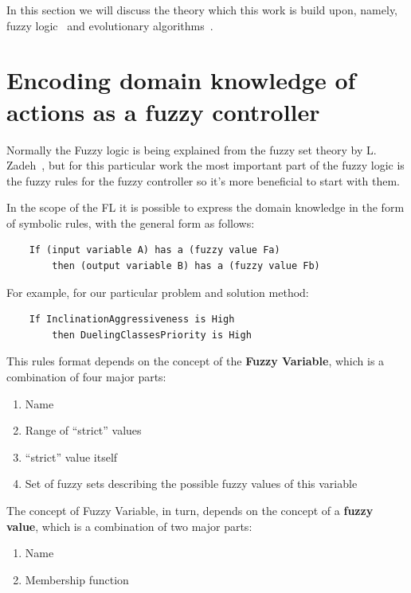 \documentclass[12pt, a4paper]{report}
\begin{document}
  In this section we will discuss the theory which this work is build upon, namely, fuzzy logic~\cite{ray2014softcomputing} and evolutionary algorithms~\cite{mitchell1999geneticalgorithms}.

	\section{Encoding domain knowledge of actions as a fuzzy controller}

  Normally the Fuzzy logic is being explained from the fuzzy set theory by L. Zadeh~\cite{zadeh1965fuzzy}, but for this particular work the most important part of the fuzzy logic is the fuzzy rules for the fuzzy controller so it's more beneficial to start with them.

  In the scope of the FL it is possible to express the domain knowledge in the form of symbolic rules, with the general form as follows:

  \begin{verbatim}
    If (input variable A) has a (fuzzy value Fa) 
    	then (output variable B) has a (fuzzy value Fb)
  \end{verbatim}

  For example, for our particular problem and solution method:

  \begin{verbatim}
    If InclinationAggressiveness is High 
    	then DuelingClassesPriority is High
  \end{verbatim}

  This rules format depends on the concept of the \textbf{Fuzzy Variable}, which is a combination of four major parts:

  \begin{enumerate}
    \item Name
    \item Range of ``strict'' values
    \item ``strict'' value itself
    \item Set of fuzzy sets describing the possible fuzzy values of this variable
  \end{enumerate}

  The concept of Fuzzy Variable, in turn, depends on the concept of a \textbf{fuzzy value}, which is a combination of two major parts:

  \begin{enumerate}
    \item Name
    \item Membership function
  \end{enumerate}
\end{document}
